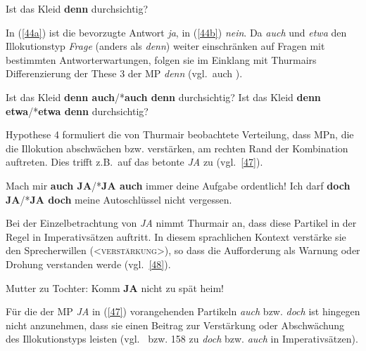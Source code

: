 \begin{exe}
	\ex\label{45} 
	Ist das Kleid \textbf{denn} durchsichtig?
\end{exe}						          
In (\ref{44a}) ist die bevorzugte Antwort \textit{ja}, in (\ref{44b}) \textit{nein}. Da \textit{auch} und\textit{ etwa} den Illokutionstyp  \textit{Frage} (anders als \textit{denn}) weiter einschränken auf Fragen mit bestimmten Antworterwartungen, folgen sie im Einklang mit Thurmairs Differenzierung der These 3 der MP \textit{denn} (vgl.\ auch \citealt[238]{Dahl1988}).

\begin{exe}
	\ex\label{46} 
		\begin{xlist}	
			\ex\label{46a} Ist das Kleid \textbf{denn auch}/*\textbf{auch denn} durchsichtig?
			\ex\label{46b} Ist das Kleid \textbf{denn etwa}/*\textbf{etwa denn} durchsichtig?
		\end{xlist}
\end{exe}
Hypothese 4 formuliert die von Thurmair beobachtete Verteilung, dass MPn, die die Illokution abschwächen bzw. verstärken, am rechten Rand der Kombination auftreten. Dies trifft z.B.\ auf das betonte \textit{JA} zu (vgl.\ \ref{47}).

\begin{exe}
	\ex\label{47} 
		\begin{xlist}	
			\ex\label{47a} Mach mir \textbf{auch JA}/*\textbf{JA auch} immer deine Aufgabe ordentlich!
			\ex\label{47b} Ich darf \textbf{doch JA}/*\textbf{JA doch} meine Autoschlüssel nicht vergessen.
		\end{xlist}
	\hfill\hbox{\citet[286]{Thurmair1989}}	
\end{exe}
Bei der Einzelbetrachtung von \textit{JA} nimmt Thurmair an, dass diese Partikel in der Regel in Imperativsätzen  auftritt. In diesem sprachlichen Kontext verstärke sie den Sprecherwillen (<\textsc{verstärkung}>), so dass die Aufforderung als Warnung oder Drohung verstanden werde (vgl.\ \ref{48}).

\begin{exe}
	\ex\label{48} 
	Mutter zu Tochter: Komm \textbf{JA} nicht zu spät heim!
	\hfill\hbox{\citet[109]{Thurmair1989}}
\end{exe}
Für die der MP \textit{JA} in (\ref{47}) vorangehenden Partikeln \textit{auch} bzw. \textit{doch} ist hingegen nicht anzunehmen, dass sie einen Beitrag zur Verstärkung oder Abschwächung des Illokutionstyps leisten (vgl.\ \citealt[118/119]{Thurmair1989} bzw. 158 zu \textit{doch} bzw. \textit{auch} in Imperativsätzen).

